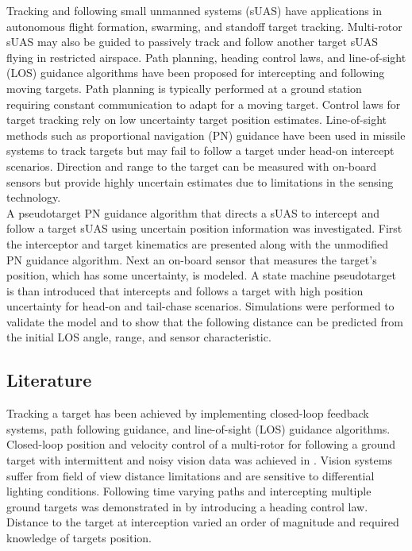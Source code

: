 \documentclass[conference]{IEEEtran}
\begin{document}
Tracking and following small unmanned systems (sUAS) have applications in autonomous flight formation, swarming, and standoff target tracking. Multi-rotor sUAS may also be guided to passively track and follow another target sUAS flying in restricted airspace. Path planning, heading control laws, and line-of-sight (LOS) guidance algorithms have been proposed for intercepting and following moving targets. Path planning is typically performed at a ground station requiring constant communication to adapt for a moving target. Control laws for target tracking rely on low uncertainty target position estimates. Line-of-sight methods such as proportional navigation (PN) guidance have been used in missile systems to track targets but may fail to follow a target under head-on intercept scenarios. Direction and range to the target can be measured with on-board sensors but provide highly uncertain estimates due to limitations in the sensing technology. \\

A pseudotarget PN guidance algorithm that directs a sUAS to intercept and follow a target sUAS using uncertain position information was investigated. First the interceptor and target kinematics are presented along with the unmodified PN guidance algorithm. Next an on-board sensor that measures the target's position, which has some uncertainty, is modeled. A state machine pseudotarget is than introduced that intercepts and follows a target with high position uncertainty for head-on and tail-chase scenarios. Simulations were performed to validate the model and to show that the following distance can be predicted from the initial LOS angle, range, and sensor characteristic.



\subsection{Literature}
Tracking a target has been achieved by implementing closed-loop feedback systems, path following guidance, and line-of-sight (LOS) guidance algorithms. Closed-loop position and velocity control of a multi-rotor for following a ground target with intermittent and noisy vision data was achieved in \cite{teuliere_chasing_2011}. Vision systems suffer from field of view distance limitations and are sensitive to differential lighting conditions. Following time varying paths and intercepting multiple ground targets was demonstrated in \cite{oliveira_moving_2016} by introducing a heading control law. Distance to the target at interception varied an order of magnitude and required knowledge of targets position. 
\end{document}
